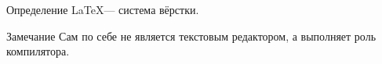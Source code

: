\begin{block}{Определение}
  \LaTeX --- система вёрстки.
\end{block}
\begin{alertblock}{Замечание}
  Сам по себе не является текстовым редактором, а выполняет роль компилятора.
\end{alertblock}